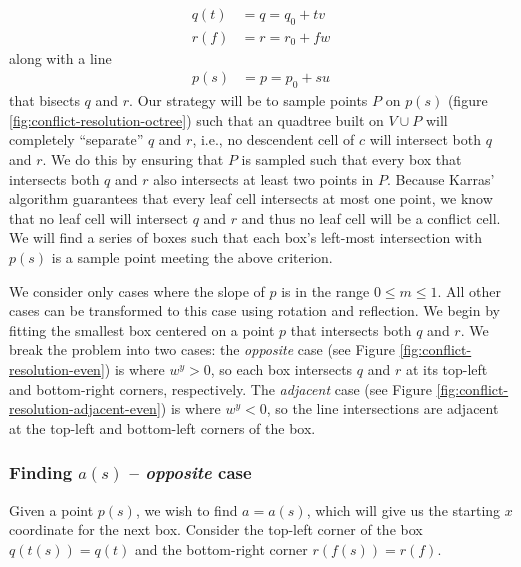 \documentclass{egpubl}
\begin{document}
\begin{align}
q(t) &= q = q_0 + tv \label{eqn:q} \\
r(f) &= r = r_0 + fw \label{eqn:r}
\end{align}
along with a line
\begin{align}
p(s) &= p = p_0 + su \label{eqn:p}
\end{align}
that bisects $q$ and $r$. Our strategy will be to sample points $P$ on $p(s)$ (figure \ref{fig:conflict-resolution-octree}) such that an quadtree built on $V \cup P$ will completely ``separate'' $q$ and $r$, i.e., no descendent cell of $c$ will intersect both $q$ and $r$. We do this by ensuring that $P$ is sampled such that every box that intersects both $q$ and $r$ also intersects at least two points in $P$. Because Karras' algorithm guarantees that every leaf cell intersects at most one point, we know that no leaf cell will intersect $q$ and $r$ and thus no leaf cell will be a conflict cell. We will find a series of boxes such that each box's left-most intersection with $p(s)$ is a sample point meeting the above criterion.

We consider only cases where the slope of $p$ is in the range $0 \le m \le 1$. All other cases can be transformed to this case using rotation and reflection. We begin by fitting the smallest box centered on a point $p$ that intersects both $q$ and $r$. We break the problem into two cases: the \textit{opposite} case (see Figure \ref{fig:conflict-resolution-even}) is where $w^y > 0$, so each box intersects $q$ and $r$ at its top-left and bottom-right corners, respectively. The \textit{adjacent} case (see Figure \ref{fig:conflict-resolution-adjacent-even}) is where $w^y < 0$, so the line intersections are adjacent at the top-left and bottom-left corners of the box.

\subsubsection{Finding $a(s)$ -- \textit{opposite} case}

Given a point $p(s)$, we wish to find $a=a(s)$, which will give us the starting $x$ coordinate for the next box. Consider the top-left corner of the box $q(t(s))=q(t)$ and the bottom-right corner $r(f(s))=r(f)$.
\end{document}
